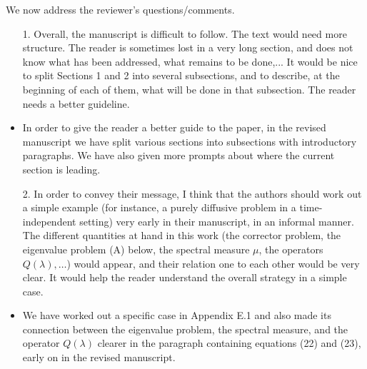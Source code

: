 \documentclass[amsa]{article}
\begin{document}
We now address the reviewer's questions/comments.


\begin{itemize}
\item[1.] Overall, the manuscript is difficult to follow. The text
  would need more structure. The reader is sometimes lost in a very
  long section, and does not know what has been addressed, what
  remains to be done,...  It would be nice to split Sections 1 and 2
  into several subsections, and to describe, at the beginning of each
  of them, what will be done in that subsection. The reader needs a
  better guideline.   
%
\item  In order to give the reader a better guide to the paper, in the
  revised manuscript we have split various sections into subsections
  with introductory paragraphs. We have also given more prompts about
  where the current section is leading.  
%
\item[2.] In order to convey their message, I think that the authors
  should work out a simple example (for instance, a purely diffusive
  problem in a time-independent setting) very early in their
  manuscript, in an informal manner. The different quantities at hand
  in this work (the corrector problem, the eigenvalue problem (A) 
  below, the spectral measure $\mu$, the operators $Q(\lambda),\ldots$) would
  appear, and their relation one to each other would be very clear. It
  would help the reader understand the overall strategy in a simple
  case.   
%
\item We have worked out a specific case in Appendix E.1 and also made
  its connection between the eigenvalue problem, the spectral measure,
  and the operator $Q(\lambda)$ clearer in the paragraph containing equations
  (22) and (23), early on in the revised manuscript. 
 

\end{itemize}
\end{document}
